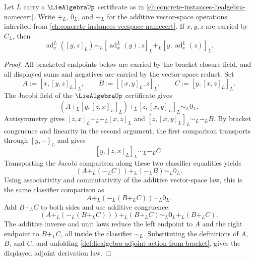 \begin{theorem}
\label{thm:liealgebra-adjoint-action-derivation-from-jacobi}
Let $L$ carry a $\LieAlgebraUp$ certificate as in \autoref{ch:concrete-instances-liealgebra-namecert}. Write $+_{L}$, $0_{L}$, and $-_{L}$ for the additive vector-space operations inherited from \autoref{ch:concrete-instances-vecspace-namecert}. If $x,y,z$ are carried by $C_L$, then
$$
\operatorname{ad}^{L}_{x}([y,z]_L)
\sim_{L}
[\operatorname{ad}^{L}_{x}(y),z]_L+_{L}[y,\operatorname{ad}^{L}_{x}(z)]_L.
$$
\end{theorem}
\begin{proof}
All bracketed endpoints below are carried by the bracket-closure field, and all displayed sums and negatives are carried by the vector-space reduct. Set
$$
A:=[x,[y,z]_L]_L,
\qquad
B:=[[x,y]_L,z]_L,
\qquad
C:=[y,[x,z]_L]_L.
$$
The Jacobi field of the $\LieAlgebraUp$ certificate gives
$$
(A+_{L}[y,[z,x]_L]_L)+_{L}[z,[x,y]_L]_L\sim_{L}0_{L}.
$$
Antisymmetry gives $[z,x]_L\sim_{L}-_{L}[x,z]_L$ and $[z,[x,y]_L]_L\sim_{L}-_{L}B$. By bracket congruence and linearity in the second argument, the first comparison transports through $[y,-]_L$ and gives
$$
[y,[z,x]_L]_L\sim_{L}-_{L}C.
$$
Transporting the Jacobi comparison along these two classifier equalities yields
$$
(A+_{L}(-_{L}C))+_{L}(-_{L}B)\sim_{L}0_{L}.
$$
Using associativity and commutativity of the additive vector-space law, this is the same classifier comparison as
$$
A+_{L}(-_{L}(B+_{L}C))\sim_{L}0_{L}.
$$
Add $B+_{L}C$ to both sides and use additive congruence:
$$
(A+_{L}(-_{L}(B+_{L}C)))+_{L}(B+_{L}C)
\sim_{L}
0_{L}+_{L}(B+_{L}C).
$$
The additive inverse and unit laws reduce the left endpoint to $A$ and the right endpoint to $B+_{L}C$, all inside the classifier $\sim_{L}$. Substituting the definitions of $A$, $B$, and $C$, and unfolding \autoref{def:liealgebra-adjoint-action-from-bracket}, gives the displayed adjoint derivation law.
\end{proof}

